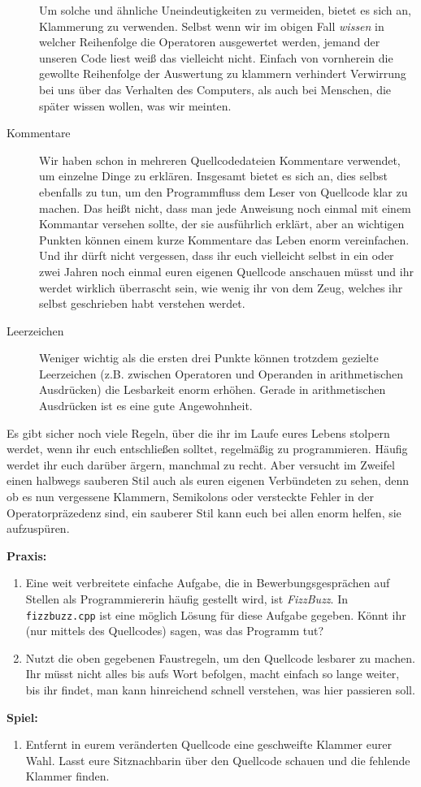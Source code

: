 \begin{description}
        Um solche und ähnliche Uneindeutigkeiten zu vermeiden, bietet es sich
        an, Klammerung zu verwenden. Selbst wenn wir im obigen Fall
        \emph{wissen} in welcher Reihenfolge die Operatoren ausgewertet werden,
        jemand der unseren Code liest weiß das vielleicht nicht. Einfach von
        vornherein die gewollte Reihenfolge der Auswertung zu klammern
        verhindert Verwirrung bei uns über das Verhalten des Computers, als
        auch bei Menschen, die später wissen wollen, was wir meinten.
    \item[Kommentare]
        Wir haben schon in mehreren Quellcodedateien Kommentare verwendet, um
        einzelne Dinge zu erklären. Insgesamt bietet es sich an, dies selbst
        ebenfalls zu tun, um den Programmfluss dem Leser von Quellcode klar zu
        machen. Das heißt nicht, dass man jede Anweisung noch einmal mit einem
        Kommantar versehen sollte, der sie ausführlich erklärt, aber an
        wichtigen Punkten können einem kurze Kommentare das Leben enorm
        vereinfachen. Und ihr dürft nicht vergessen, dass ihr euch vielleicht
        selbst in ein oder zwei Jahren noch einmal euren eigenen Quellcode
        anschauen müsst und ihr werdet wirklich überrascht sein, wie wenig ihr
        von dem Zeug, welches ihr selbst geschrieben habt verstehen werdet.
    \item[Leerzeichen]
        Weniger wichtig als die ersten drei Punkte können trotzdem gezielte
        Leerzeichen (z.B. zwischen Operatoren und Operanden in arithmetischen
        Ausdrücken) die Lesbarkeit enorm erhöhen. Gerade in arithmetischen
        Ausdrücken ist es eine gute Angewohnheit.
\end{description}

Es gibt sicher noch viele Regeln, über die ihr im Laufe eures Lebens stolpern
werdet, wenn ihr euch entschließen solltet, regelmäßig zu programmieren. Häufig
werdet ihr euch darüber ärgern, manchmal zu recht. Aber versucht im Zweifel
einen halbwegs sauberen Stil auch als euren eigenen Verbündeten zu sehen, denn
ob es nun vergessene Klammern, Semikolons oder versteckte Fehler in der
Operatorpräzedenz sind, ein sauberer Stil kann euch bei allen enorm helfen, sie
aufzuspüren.

\textbf{Praxis:}
\begin{enumerate}
    \item Eine weit verbreitete einfache Aufgabe, die in Bewerbungsgesprächen
        auf Stellen als Programmiererin häufig gestellt wird, ist
        \emph{FizzBuzz}. In \texttt{fizzbuzz.cpp} ist eine möglich Lösung für
        diese Aufgabe gegeben. Könnt ihr (nur mittels des Quellcodes) sagen,
        was das Programm tut?
    \item Nutzt die oben gegebenen Faustregeln, um den Quellcode lesbarer zu
        machen. Ihr müsst nicht alles bis aufs Wort befolgen, macht einfach so
        lange weiter, bis ihr findet, man kann hinreichend schnell verstehen,
        was hier passieren soll.
\end{enumerate}


\textbf{Spiel:}
\begin{enumerate}
    \item Entfernt in eurem veränderten Quellcode eine geschweifte Klammer
        eurer Wahl. Lasst eure Sitznachbarin über den Quellcode schauen und die
        fehlende Klammer finden.
\end{enumerate}
